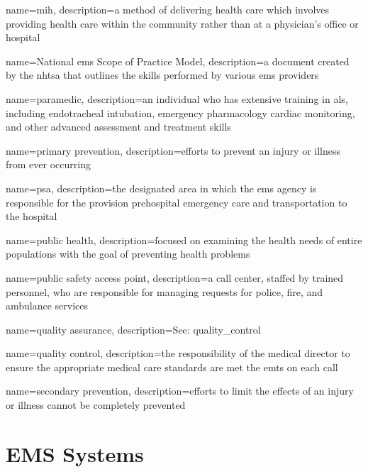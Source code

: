 \documentclass[../EMT-169.tex]{subfiles}
\begin{document}
	{
		name=\acrlong{mih},
		description={a method of delivering health care which involves providing health care within the community rather than at a physician's office or hospital}
	}

	{
		name=National \acrshort{ems} Scope of Practice Model,
		description={a document created by the \acrfull{nhtsa} that outlines the skills performed by various \acrshort{ems} providers}
	}

	{
		name=paramedic,
		description={an individual who has extensive training in \acrlong{als}, including endotracheal intubation, emergency pharmacology cardiac monitoring, and other advanced assessment and treatment skills}
	}

	{
		name=primary prevention,
		description={efforts to prevent an injury or illness from ever occurring}
	}

	{
		name=\acrlong{psa},
		description={the designated area in which the \acrshort{ems} agency is responsible for the provision prehospital emergency care and transportation to the hospital}
	}

	{
		name=public health,
		description={focused on examining the health needs of entire populations with the goal of preventing health problems}
	}

	{
		name=public safety access point,
		description={a call center, staffed by trained personnel, who are responsible for managing requests for police, fire, and ambulance services}
	}

	{
		name=quality assurance,
		description={See: \gls{quality_control}}
	}

	{
		name=quality control,
		description={the responsibility of the medical director to ensure the appropriate medical care standards are met the \acrshort{emt}s on each call}
	}

	{
		name=secondary prevention,
		description={efforts to limit the effects of an injury or illness cannot be completely prevented} %
	}

	
\chapter{EMS Systems}
\end{document}
